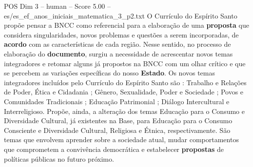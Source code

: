 \begin{textsample}{POS Dim 3 – human – Score 5.00 – es/es\_ef\_anos\_iniciais\_matematica\_3\_p2.txt}  \label{ex:f3_pos_019}
O Currículo do Espírito Santo propõe pensar a BNCC como referencial para a elaboração de uma \textbf{proposta} que considera singularidades, novos problemas e questões a serem incorporadas, de \textbf{acordo} com as características de cada região.
Nesse sentido, no processo de elaboração do \textbf{documento}, surgiu a necessidade de acrescentar novos temas integradores e retomar alguns já propostos na BNCC com um olhar crítico e que se percebem as variações específicas do nosso \textbf{Estado}.
Os novos temas integradores incluídos pelo Currículo do Espírito Santo são : Trabalho e Relações de Poder, Ética e Cidadania ; Gênero, Sexualidade, Poder e Sociedade ; Povos e Comunidades Tradicionais ; Educação Patrimonial ; Diálogo Intercultural e Interreligioso.
Propõe, ainda, a alteração dos temas Educação para o Consumo e Diversidade Cultural, já existentes na Base, para Educação para o Consumo Consciente e Diversidade Cultural, Religiosa e Étnica, respectivamente.
São temas que envolvem aprender sobre a sociedade atual, mudar comportamentos que comprometem a convivência democrática e estabelecer \textbf{propostas} de políticas públicas no futuro próximo.

\end{textsample}
